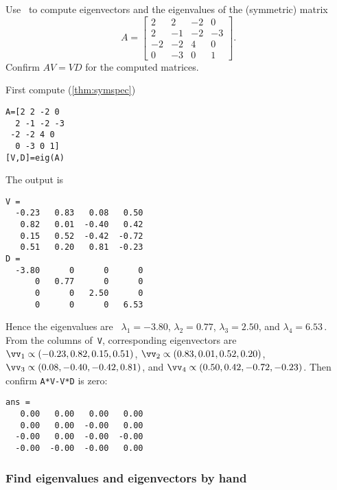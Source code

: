 \begin{example} 
Use \script\ to compute eigenvectors and the eigenvalues of the (symmetric) matrix
\begin{equation*}
A=\begin{bmatrix} 2&2&-2&0
\\2&-1&-2&-3
\\-2&-2&4&0
\\0&-3&0&1
 \end{bmatrix}.
\end{equation*}
Confirm \(AV=VD\) for the computed matrices.
\begin{solution} 
First compute (\cref{thm:symspec})
\setbox\ajrqrbox\hbox{}%
\marginajrbox%
\begin{verbatim}
A=[2 2 -2 0
  2 -1 -2 -3
 -2 -2 4 0
  0 -3 0 1]
[V,D]=eig(A)
\end{verbatim}
The output is \twodp
\begin{verbatim}
V =
  -0.23   0.83   0.08   0.50
   0.82   0.01  -0.40   0.42
   0.15   0.52  -0.42  -0.72
   0.51   0.20   0.81  -0.23
D =
  -3.80      0      0      0
      0   0.77      0      0
      0      0   2.50      0
      0      0      0   6.53
\end{verbatim}
Hence the eigenvalues are \twodp\ \(\lambda_1=-3.80\), \(\lambda_2=0.77\), \(\lambda_3=2.50\), and \(\lambda_4=6.53\)\,.
From the columns of~\verb|V|, corresponding eigenvectors are \twodp\  
\(\vv_1\propto(-0.23,0.82,0.15,0.51)\),
\(\vv_2\propto(0.83,0.01,0.52,0.20)\),
\(\vv_3\propto(0.08,-0.40,-0.42,0.81)\), and
\(\vv_4\propto(0.50,0.42,-0.72,-0.23)\).
Then confirm \verb|A*V-V*D| is zero:
\begin{verbatim}
ans =
   0.00   0.00   0.00   0.00
   0.00   0.00  -0.00   0.00
  -0.00   0.00  -0.00  -0.00
  -0.00  -0.00  -0.00   0.00
\end{verbatim}
\end{solution}
\end{example}








\subsubsection{Find eigenvalues and eigenvectors by hand}
\label{sec:feebh}

